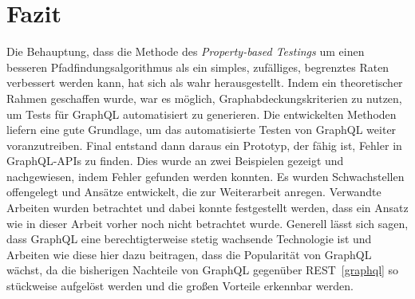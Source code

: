 \chapter{Fazit}
\label{fazit}

Die Behauptung, dass die Methode des \textit{Property-based Testings} um einen besseren Pfadfindungsalgorithmus als ein simples, zufälliges, begrenztes Raten verbessert werden kann, hat sich als wahr herausgestellt.
Indem ein theoretischer Rahmen geschaffen wurde, war es möglich, Graphabdeckungskriterien zu nutzen, um Tests für GraphQL automatisiert zu generieren.
Die entwickelten Methoden liefern eine gute Grundlage, um das automatisierte Testen von GraphQL weiter voranzutreiben.
Final entstand dann daraus ein Prototyp, der fähig ist, Fehler in GraphQL-APIs zu finden.
Dies wurde an zwei Beispielen gezeigt und nachgewiesen, indem Fehler gefunden werden konnten.
Es wurden Schwachstellen offengelegt und Ansätze entwickelt, die zur Weiterarbeit anregen.
Verwandte Arbeiten wurden betrachtet und dabei konnte festgestellt werden, dass ein Ansatz wie in dieser Arbeit vorher noch nicht betrachtet wurde.
Generell lässt sich sagen, dass GraphQL eine berechtigterweise stetig wachsende Technologie ist und Arbeiten wie diese hier
dazu beitragen, dass die Popularität von GraphQL wächst, da die bisherigen Nachteile von GraphQL gegenüber REST~\ref{graphql} so stückweise aufgelöst werden
und die großen Vorteile erkennbar werden.

